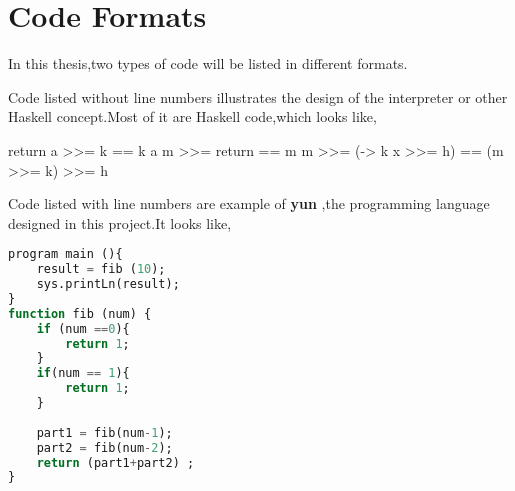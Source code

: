 \section{Code Formats}
In this thesis,two types of code will be listed in different formats.

Code listed without line numbers illustrates the design of the interpreter or other Haskell concept.Most of it are Haskell code,which looks like,
\begin{hcode}
 return a >>= k  ==  k a
 m >>= return  ==  m
 m >>= (\x -> k x >>= h)  ==  (m >>= k) >>= h
\end{hcode}


Code listed with line numbers are example of \textbf{yun} ,the programming language designed in this project.It looks like,

\begin{lstlisting}[language=SQL]
program main (){
	result = fib (10);
	sys.printLn(result);	
} 
function fib (num) {
	if (num ==0){
		return 1;
	}
	if(num == 1){
		return 1;
	}
	
	part1 = fib(num-1);
	part2 = fib(num-2);
	return (part1+part2) ;
}
\end{lstlisting}
